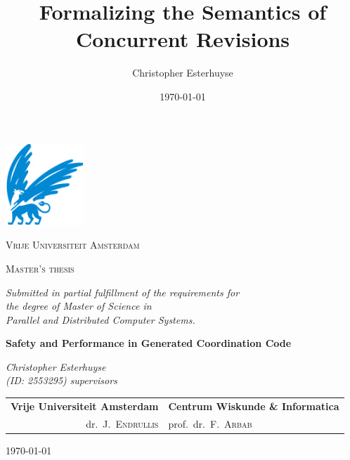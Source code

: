 \documentclass[11pt]{report}
\title{Formalizing the Semantics of Concurrent Revisions}
\author{Christopher Esterhuyse}
\date{\today}
\begin{document}

\begin{titlepage}
	\centering
	\includegraphics[width=0.22\textwidth, trim={0 0.15cm 0 0}, clip]{img/vu.png}
	\par
	{\scshape\huge Vrije Universiteit Amsterdam \par}
	\vspace{1.5cm}
	{\scshape\LARGE Master's thesis\par \par
	\vspace{0.2cm}
	\small \textit{Submitted in partial fulfillment of the requirements for\\ the degree of Master of Science in\\ Parallel and Distributed Computer Systems.}\par}
	\vspace{1.5cm}
	{\Huge\bfseries \rm \textbf{Safety and Performance in Generated Coordination Code}\par}
	\vspace{1.5cm}
	{\Large\itshape\rm \noindent\textit{Christopher Esterhuyse}\\}
	\vspace{1mm}
	\textit{(ID: 2553295)}
	\vfill
		\rm \noindent \textit{supervisors} \\ \vspace{0.15cm}
	\begin{tabular}{r@{\hskip 0.4in}l}
\rm \hspace{3mm} \textbf{Vrije Universiteit Amsterdam} & \textbf{Centrum Wiskunde \& Informatica} \\ 
dr.\ J.\ \textsc{Endrullis} & prof.\ dr.\ F.\ \textsc{Arbab}
\end{tabular}

	\vfill

	{\large \today\par}
\end{titlepage}
\end{document}
